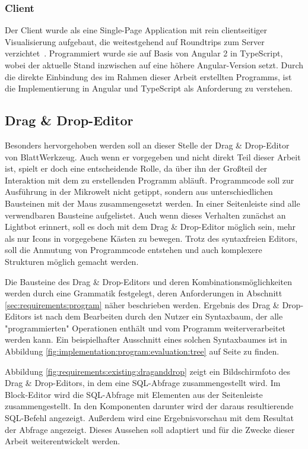 \subsubsection{Client}

Der Client wurde als eine Single-Page Application mit rein clientseitiger Visualisierung aufgebaut, die weitestgehend auf Roundtrips zum Server verzichtet~\cite[94-95]{riemer2016}. Programmiert wurde sie auf Basis von Angular 2 in TypeScript, wobei der aktuelle Stand inzwischen auf eine höhere Angular-Version setzt. Durch die direkte Einbindung des im Rahmen dieser Arbeit erstellten Programms, ist die Implementierung in Angular und TypeScript als Anforderung zu verstehen.

\subsection{Drag \& Drop-Editor}
\label{sec:requirements:existing:structure:drag-drop}

Besonders hervorgehoben werden soll an dieser Stelle der Drag \& Drop-Editor von BlattWerkzeug. Auch wenn er vorgegeben und nicht direkt Teil dieser Arbeit ist, spielt er doch eine entscheidende Rolle, da über ihn der Großteil der Interaktion mit dem zu erstellenden Programm abläuft. Programmcode soll zur Ausführung in der Mikrowelt nicht getippt, sondern aus unterschiedlichen Bausteinen mit der Maus zusammengesetzt werden. In einer Seitenleiste sind alle verwendbaren Bausteine aufgelistet. Auch wenn dieses Verhalten zunächst an Lightbot erinnert, soll es doch mit dem Drag \& Drop-Editor möglich sein, mehr als nur Icons in vorgegebene Kästen zu bewegen. Trotz des syntaxfreien Editors, soll die Anmutung von Programmcode entstehen und auch komplexere Strukturen möglich gemacht werden.

Die Bausteine des Drag \& Drop-Editors und deren Kombinationsmöglichkeiten werden durch eine Grammatik festgelegt, deren Anforderungen in Abschnitt \ref{sec:requirements:program} näher beschrieben werden. Ergebnis des Drag \& Drop-Editors ist nach dem Bearbeiten durch den Nutzer ein Syntaxbaum, der alle "programmierten" Operationen enthält und vom Programm weiterverarbeitet werden kann. Ein beispielhafter Ausschnitt eines solchen Syntaxbaumes ist in Abbildung \ref{fig:implementation:program:evaluation:tree} auf Seite \pageref{fig:implementation:program:evaluation:tree} zu finden.

Abbildung \ref{fig:requirements:existing:draganddrop} zeigt ein Bildschirmfoto des Drag \& Drop-Editors, in dem eine SQL-Abfrage zusammengestellt wird. Im Block-Editor wird die SQL-Abfrage mit Elementen aus der Seitenleiste zusammengestellt. In den Komponenten darunter wird der daraus resultierende SQL-Befehl angezeigt. Außerdem wird eine Ergebnisvorschau mit dem Resultat der Abfrage angezeigt. Dieses Aussehen soll adaptiert und für die Zwecke dieser Arbeit weiterentwickelt werden.

